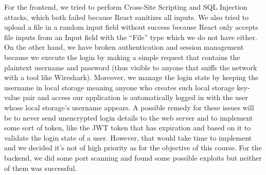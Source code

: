     For the frontend, we tried to perform Cross-Site Scripting and SQL Injection attacks, which both failed because React sanitizes all inputs. We also tried to upload a file in a random input field without success because React only accepts file inputs from an Input field with the “File” type which we do not have either. On the other hand, we have broken authentication and session management because we execute the login by making a simple request that contains the plaintext username and password (thus visible to anyone that sniffs the network with a tool like Wireshark). Moreover, we manage the login state by keeping the username in local storage meaning anyone who creates such local storage key-value pair and access our application is automatically logged in with the user whose local storage’s username appears. A possible remedy for these issues will be to never send unencrypted login details to the web server and to implement some sort of token, like the JWT token that has expiration and based on it to validate the login state of a user. However, that would take time to implement and we decided it's not of high priority as for the objective of this course. 
    For the backend, we did some port scanning and found some possible exploits but neither of them was successful. 